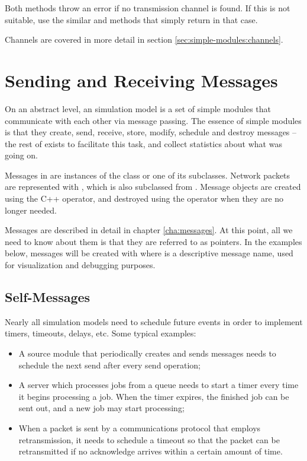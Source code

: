 \begin{ned}

Both methods throw an error if no transmission channel is found. If this
is not suitable, use the similar  and
 methods that simply return
 in that case.

Channels are covered in more detail in section \ref{sec:simple-modules:channels}.


\section{Sending and Receiving Messages}
\label{sec:simple-modules:sending-and-receiving}

On an abstract level, an {\opp} simulation model is a set of
simple modules that communicate with each other via message passing.
The essence of simple modules is that they create, send, receive,
store, modify, schedule and destroy messages -- the rest of {\opp} exists
to facilitate this task, and collect statistics
about what was going on.

Messages in {\opp} are instances of the  class or one of
its subclasses. Network packets are represented with ,
which is also subclassed from . Message objects are
created using the C++  operator, and destroyed using the
 operator when they are no longer needed.

Messages are described in detail in chapter \ref{cha:messages}.
At this point, all we need to know about them is that they are
referred to as  pointers. In the examples below,
messages will be created with  where
 is a descriptive message name, used for visualization
and debugging purposes.


\subsection{Self-Messages}
\label{sec:simple-modules:self-messages}

Nearly all simulation models need to schedule future events in order
to implement timers, timeouts, delays, etc. Some typical examples:

\begin{itemize}
  \item A source module that periodically creates and sends messages
    needs to schedule the next send after every send operation;
  \item A server which processes jobs from a queue needs to start
    a timer every time it begins processing a job. When the timer
    expires, the finished job can be sent out, and a new job may
    start processing;
  \item When a packet is sent by a communications protocol that employs
    retransmission, it needs to schedule a timeout so that the packet
    can be retransmitted if no acknowledge arrives within a certain
    amount of time.
\end{itemize}


\end{ned}
